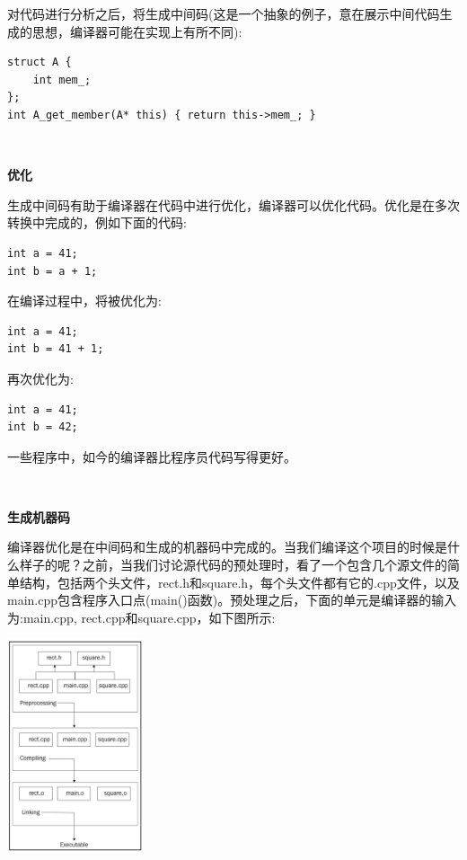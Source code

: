 对代码进行分析之后，将生成中间码(这是一个抽象的例子，意在展示中间代码生成的思想，编译器可能在实现上有所不同):\par	

\begin{lstlisting}[caption={}]
struct A {
	int mem_;
};
int A_get_member(A* this) { return this->mem_; }
\end{lstlisting}

\noindent\textbf{}\ \par
\textbf{优化}\ \par	
生成中间码有助于编译器在代码中进行优化，编译器可以优化代码。优化是在多次转换中完成的，例如下面的代码: \par

\begin{lstlisting}[caption={}]
int a = 41;
int b = a + 1;
\end{lstlisting}

在编译过程中，将被优化为: \par

\begin{lstlisting}[caption={}]
int a = 41;
int b = 41 + 1;
\end{lstlisting}

再次优化为: \par

\begin{lstlisting}[caption={}]
int a = 41;
int b = 42;
\end{lstlisting}

一些程序中，如今的编译器比程序员代码写得更好。 \par

\noindent\textbf{}\ \par
\textbf{生成机器码}\ \par	
编译器优化是在中间码和生成的机器码中完成的。当我们编译这个项目的时候是什么样子的呢？之前，当我们讨论源代码的预处理时，看了一个包含几个源文件的简单结构，包括两个头文件，rect.h和square.h，每个头文件都有它的.cpp文件，以及main.cpp包含程序入口点(main()函数)。预处理之后，下面的单元是编译器的输入为:main.cpp, rect.cpp和square.cpp，如下图所示: \par	

\begin{center}
	\includegraphics[width=0.3\textwidth]{content/Section-1/Chapter-1/3}
\end{center}

